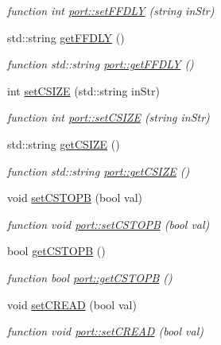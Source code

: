 \begin{DoxyCompactItemize}
\begin{DoxyCompactList}\small\item\em function int \hyperlink{classport_aac53f4a9f4f82a6886d7d3ea3a313880}{port\+::set\+F\+F\+D\+LY} (string in\+Str) \end{DoxyCompactList}\item 
std\+::string \hyperlink{classport_a5f6dee4481213d1b9af115b379a872b4}{get\+F\+F\+D\+LY} ()
\begin{DoxyCompactList}\small\item\em function std\+::string \hyperlink{classport_a5f6dee4481213d1b9af115b379a872b4}{port\+::get\+F\+F\+D\+LY} () \end{DoxyCompactList}\item 
int \hyperlink{classport_a4a5196aff46a1bbd7d83d451fb0a1f84}{set\+C\+S\+I\+ZE} (std\+::string in\+Str)
\begin{DoxyCompactList}\small\item\em function int \hyperlink{classport_a4a5196aff46a1bbd7d83d451fb0a1f84}{port\+::set\+C\+S\+I\+ZE} (string in\+Str) \end{DoxyCompactList}\item 
std\+::string \hyperlink{classport_ae522c4cf7e2eb5e89d3b062ad1a6270e}{get\+C\+S\+I\+ZE} ()
\begin{DoxyCompactList}\small\item\em function std\+::string \hyperlink{classport_ae522c4cf7e2eb5e89d3b062ad1a6270e}{port\+::get\+C\+S\+I\+ZE} () \end{DoxyCompactList}\item 
void \hyperlink{classport_ac118b2b26d60ffe58e11f7b6c75c8260}{set\+C\+S\+T\+O\+PB} (bool val)
\begin{DoxyCompactList}\small\item\em function void \hyperlink{classport_ac118b2b26d60ffe58e11f7b6c75c8260}{port\+::set\+C\+S\+T\+O\+PB} (bool val) \end{DoxyCompactList}\item 
bool \hyperlink{classport_ac792060b6fc53cea0e0a3476b338ddb3}{get\+C\+S\+T\+O\+PB} ()
\begin{DoxyCompactList}\small\item\em function bool \hyperlink{classport_ac792060b6fc53cea0e0a3476b338ddb3}{port\+::get\+C\+S\+T\+O\+PB} () \end{DoxyCompactList}\item 
void \hyperlink{classport_ade51ac47a0f6247189d7fcf143ac2246}{set\+C\+R\+E\+AD} (bool val)
\begin{DoxyCompactList}\small\item\em function void \hyperlink{classport_ade51ac47a0f6247189d7fcf143ac2246}{port\+::set\+C\+R\+E\+AD} (bool val) \end{DoxyCompactList}\item 

\end{DoxyCompactItemize}
